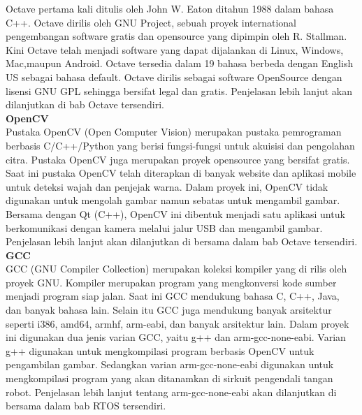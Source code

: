 \documentclass[11pt,fleqn]{book} %
\begin{document}
\begin{flushleft}
 \hspace{10pt} Octave pertama kali ditulis oleh John W. Eaton ditahun 1988 dalam bahasa C++. 
 Octave dirilis oleh GNU Project, sebuah proyek international pengembangan software gratis dan opensource yang dipimpin oleh R. Stallman. 
 Kini Octave telah menjadi software yang dapat dijalankan di Linux, Windows, Mac,maupun Android. 
 Octave tersedia dalam 19 bahasa berbeda dengan English US sebagai bahasa default. 
 Octave dirilis sebagai software OpenSource dengan lisensi GNU GPL sehingga bersifat legal dan gratis.
 Penjelasan lebih lanjut akan dilanjutkan di bab Octave tersendiri.\\
 
 \vspace{5pt}
 \textbf{OpenCV}\\
 \hspace{10pt} Pustaka OpenCV (Open Computer Vision) merupakan pustaka pemrograman berbasis C/C++/Python yang berisi fungsi-fungsi untuk akuisisi dan pengolahan citra.
  Pustaka OpenCV juga merupakan proyek opensource yang bersifat gratis.
  Saat ini pustaka OpenCV telah diterapkan di banyak website dan aplikasi mobile untuk deteksi wajah dan penjejak warna.
  Dalam proyek ini, OpenCV tidak digunakan untuk mengolah gambar namun sebatas untuk mengambil gambar.
  Bersama dengan Qt (C++), OpenCV ini dibentuk menjadi satu aplikasi untuk berkomunikasi dengan kamera melalui jalur USB dan mengambil gambar.
  Penjelasan lebih lanjut akan dilanjutkan di bersama dalam bab Octave tersendiri.\\
  
 \vspace{5pt}
 \textbf{GCC}\\
 \hspace{10pt} GCC (GNU Compiler Collection) merupakan koleksi kompiler yang di rilis oleh proyek GNU.
 Kompiler merupakan program yang mengkonversi kode sumber menjadi program siap jalan.
 Saat ini GCC mendukung bahasa C, C++, Java, dan banyak bahasa lain.
 Selain itu GCC juga mendukung banyak arsitektur seperti i386, amd64, armhf, arm-eabi, dan banyak arsitektur lain.
 Dalam proyek ini digunakan dua jenis varian GCC, yaitu g++ dan arm-gcc-none-eabi.
 Varian g++ digunakan untuk mengkompilasi program berbasis OpenCV untuk pengambilan gambar.
 Sedangkan varian arm-gcc-none-eabi digunakan untuk mengkompilasi program yang akan ditanamkan di sirkuit pengendali tangan robot.
 Penjelasan lebih lanjut tentang arm-gcc-none-eabi akan dilanjutkan di bersama dalam bab RTOS tersendiri.\\
 

\end{flushleft}
\end{document}
